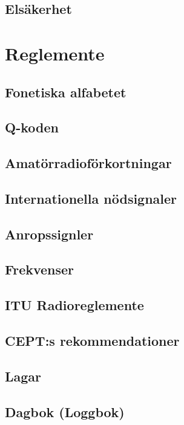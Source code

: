 \documentclass[10pt,openany]{report}
\begin{document}
\chapter{Elsäkerhet}



\setcounter{part}{17}
\setcounter{chapter}{0}
\part{Reglemente}

\chapter{Fonetiska alfabetet}


\chapter{Q-koden}


\chapter{Amatörradioförkortningar}


\chapter{Internationella nödsignaler}


\chapter{Anropssignler}


\chapter{Frekvenser}


\chapter{ITU Radioreglemente}


\chapter{CEPT:s rekommendationer}


\chapter{Lagar}


\chapter{Dagbok (Loggbok)}

\end{document}
